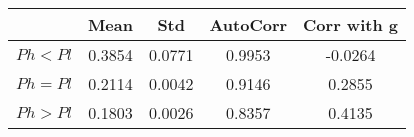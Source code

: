 \begin{tiny}\begin{tabular}{|l|c|c|c|c|}
\hline
&\textbf{Mean}&\textbf{Std}&\textbf{AutoCorr}&\textbf{Corr with g}\\\hline
\textbf{$Ph<Pl$}&0.3854&0.0771&0.9953&-0.0264\\\hline
\textbf{$Ph=Pl$}&0.2114&0.0042&0.9146&0.2855\\\hline
\textbf{$Ph>Pl$}&0.1803&0.0026&0.8357&0.4135\\\hline
\end{tabular}
\end{tiny}